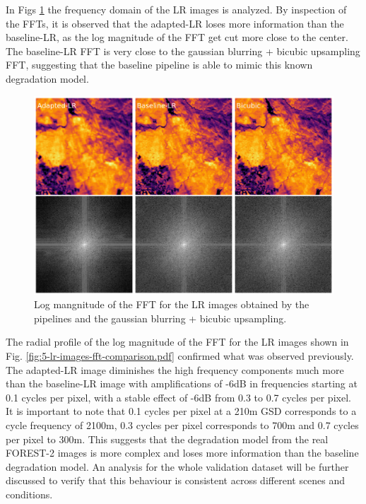         In Figs \ref{fig:5-lr-images-fft.pdf} the frequency domain of the LR images is analyzed.
        By inspection of the FFTs, it is observed that the adapted-LR loses more information than the baseline-LR, as the log magnitude of the FFT get cut more close to the center.
        The baseline-LR FFT is very close to the gaussian blurring + bicubic upsampling FFT, suggesting that the baseline pipeline is able to mimic this known degradation model.

        \begin{figure}[H]
            \centering
            \includegraphics[scale=0.3]{Includes/5-lr-images-fft.pdf}
            \caption{Log mangnitude of the FFT for the LR images obtained by the pipelines and the gaussian blurring + bicubic upsampling.}
            \label{fig:5-lr-images-fft.pdf}
        \end{figure}

        The radial profile of the log magnitude of the FFT for the LR images shown in Fig. \ref{fig:5-lr-images-fft-comparison.pdf} confirmed what was observed previously.
        The adapted-LR image diminishes the high frequency components much more than the baseline-LR image with amplifications of -6dB in frequencies starting at 0.1 cycles per pixel, with a stable effect of -6dB from 0.3 to 0.7 cycles per pixel. 
        It is important to note that 0.1 cycles per pixel at a 210m GSD corresponds to a cycle frequency of 2100m, 0.3 cycles per pixel corresponds to 700m and 0.7 cycles per pixel to 300m.
        This suggests that the degradation model from the real FOREST-2 images is more complex and loses more information than the baseline degradation model.
        An analysis for the whole validation dataset will be further discussed to verify that this behaviour is consistent across different scenes and conditions.


